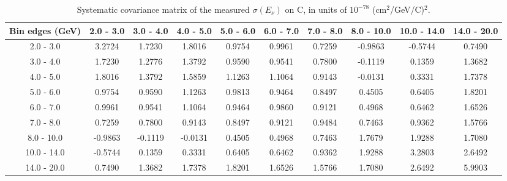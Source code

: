 \documentclass[aps,prl,twocolumn,superscriptaddress,nofootinbib]{revtex4-1}
\begin{document}
\begin{table}[h!]
  \centering
  \caption{Systematic covariance matrix of the measured $\sigma(E_{\nu})$ on C, in units of $10^{-78}$ (cm$^{2}$/GeV/C)$^{2}$.}
    \begin{tabular}{c||ccccccccc}
      Bin edges (GeV) & 2.0 - 3.0 & 3.0 - 4.0 & 4.0 - 5.0 & 5.0 - 6.0 & 6.0 - 7.0 & 7.0 - 8.0 & 8.0 - 10.0 & 10.0 - 14.0 & 14.0 - 20.0 \\
\hline \hline
        2.0 - 3.0 &  3.2724 &  1.7230 &  1.8016 &  0.9754 &  0.9961 &  0.7259 & -0.9863 & -0.5744 &  0.7490 \\
        3.0 - 4.0 &  1.7230 &  1.2776 &  1.3792 &  0.9590 &  0.9541 &  0.7800 & -0.1119 &  0.1359 &  1.3682 \\
        4.0 - 5.0 &  1.8016 &  1.3792 &  1.5859 &  1.1263 &  1.1064 &  0.9143 & -0.0131 &  0.3331 &  1.7378 \\
        5.0 - 6.0 &  0.9754 &  0.9590 &  1.1263 &  0.9813 &  0.9464 &  0.8497 &  0.4505 &  0.6405 &  1.8201 \\
        6.0 - 7.0 &  0.9961 &  0.9541 &  1.1064 &  0.9464 &  0.9860 &  0.9121 &  0.4968 &  0.6462 &  1.6526 \\
        7.0 - 8.0 &  0.7259 &  0.7800 &  0.9143 &  0.8497 &  0.9121 &  0.9484 &  0.7463 &  0.9362 &  1.5766 \\
       8.0 - 10.0 & -0.9863 & -0.1119 & -0.0131 &  0.4505 &  0.4968 &  0.7463 &  1.7679 &  1.9288 &  1.7080 \\
      10.0 - 14.0 & -0.5744 &  0.1359 &  0.3331 &  0.6405 &  0.6462 &  0.9362 &  1.9288 &  3.2803 &  2.6492 \\
      14.0 - 20.0 &  0.7490 &  1.3682 &  1.7378 &  1.8201 &  1.6526 &  1.5766 &  1.7080 &  2.6492 &  5.9903 \\
    \end{tabular}
  \label{tablecov:C_Systematic_Enu}
\end{table}
\end{document}
